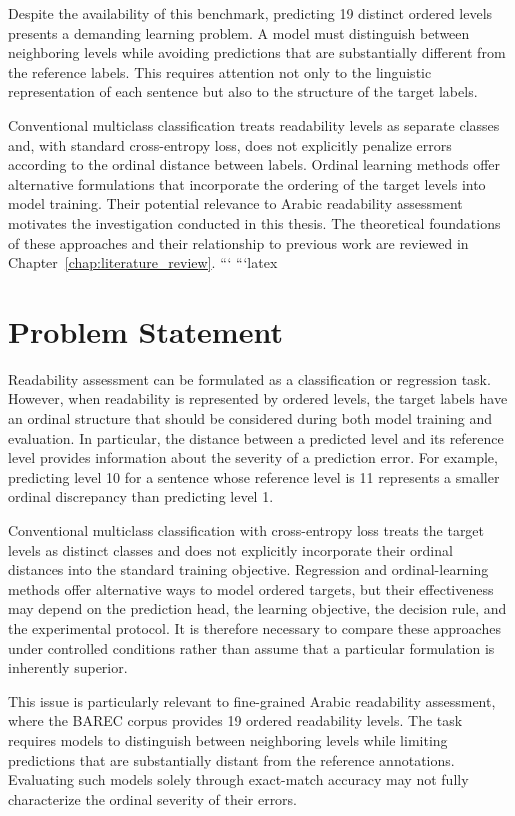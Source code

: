 \documentclass[12pt]{report}
\begin{document}
Despite the availability of this benchmark, predicting 19 distinct ordered levels presents a demanding learning problem. A model must distinguish between neighboring levels while avoiding predictions that are substantially different from the reference labels. This requires attention not only to the linguistic representation of each sentence but also to the structure of the target labels.

Conventional multiclass classification treats readability levels as separate classes and, with standard cross-entropy loss, does not explicitly penalize errors according to the ordinal distance between labels. Ordinal learning methods offer alternative formulations that incorporate the ordering of the target levels into model training. Their potential relevance to Arabic readability assessment motivates the investigation conducted in this thesis. The theoretical foundations of these approaches and their relationship to previous work are reviewed in Chapter~\ref{chap:literature_review}.
```
```latex
\section{Problem Statement}
\label{sec:problem-statement}

Readability assessment can be formulated as a classification or regression task. However, when readability is represented by ordered levels, the target labels have an ordinal structure that should be considered during both model training and evaluation. In particular, the distance between a predicted level and its reference level provides information about the severity of a prediction error. For example, predicting level 10 for a sentence whose reference level is 11 represents a smaller ordinal discrepancy than predicting level 1.

Conventional multiclass classification with cross-entropy loss treats the target levels as distinct classes and does not explicitly incorporate their ordinal distances into the standard training objective. Regression and ordinal-learning methods offer alternative ways to model ordered targets, but their effectiveness may depend on the prediction head, the learning objective, the decision rule, and the experimental protocol. It is therefore necessary to compare these approaches under controlled conditions rather than assume that a particular formulation is inherently superior.

This issue is particularly relevant to fine-grained Arabic readability assessment, where the BAREC corpus provides 19 ordered readability levels. The task requires models to distinguish between neighboring levels while limiting predictions that are substantially distant from the reference annotations. Evaluating such models solely through exact-match accuracy may not fully characterize the ordinal severity of their errors.
\end{document}

